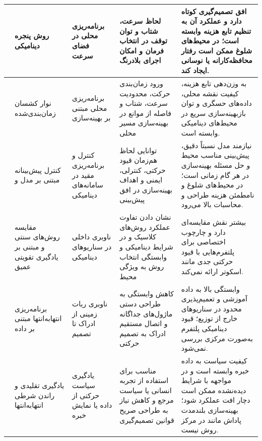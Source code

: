 \begin{longtable}{|C{2.35cm}|P{2.35cm}|P{2.65cm}|P{3.45cm}|P{3.95cm}|}
	\cite{fox1997dwa} &
	روش پنجره دینامیکی  &
	برنامه‌ریزی محلی در فضای سرعت &
	لحاظ سرعت، شتاب و توان توقف در انتخاب فرمان و امکان اجرای بلادرنگ &
	افق تصمیم‌گیری کوتاه دارد و عملکرد آن به تنظیم تابع هزینه وابسته است؛ در محیط‌های شلوغ ممکن است رفتار محافظه‌کارانه یا نوسانی ایجاد کند. \\
	\hline
	
	\cite{Quinlan1993ElasticBands,Rosmann2013TEB,Rosmann2015TEB} &
	نوار کشسان زمان‌بندی‌شده  &
	برنامه‌ریزی محلی مبتنی بر بهینه‌سازی &
	ورود زمان‌بندی حرکت، محدودیت سرعت، شتاب و فاصله از موانع در بهینه‌سازی مسیر محلی &
	به وزن‌دهی تابع هزینه، کیفیت نقشه محلی، داده‌های حسگری و توان بازبهینه‌سازی سریع در محیط‌های دینامیکی وابسته است. \\
	\hline
	
	\cite{rawlings2009mpc,Bemporad1999,Mayne2005TubeMPC} &
	کنترل پیش‌بینانه مبتنی بر مدل  و  &
	کنترل و برنامه‌ریزی مقید در سامانه‌های دینامیکی &
	توانایی لحاظ هم‌زمان قیود حرکتی، کنترلی، ایمنی و اهداف بهینه‌سازی در افق پیش‌بینی &
	نیازمند مدل نسبتاً دقیق، پیش‌بینی مناسب محیط و حل مسئله بهینه‌سازی در هر گام زمانی است؛ در محیط‌های شلوغ و نامطمئن هزینه طراحی و محاسبات بالا می‌رود. \\
	\hline
	
	\cite{s23249672} &
	مقایسه روش‌های سنتی و مبتنی بر یادگیری تقویتی عمیق &
	ناوبری داخلی در سناریوهای دینامیکی &
	نشان دادن تفاوت عملکرد روش‌های کلاسیک و  در شرایط دینامیکی و وابستگی انتخاب روش به ویژگی محیط &
	بیشتر نقش مقایسه‌ای دارد و چارچوب اختصاصی برای پلتفرم‌هایی با قیود حرکتی جدی مانند اسکوتر ارائه نمی‌کند. \\
	\hline
	
	\cite{pfeiffer2018nav} &
	برنامه‌ریزی انتهابه‌انتها مبتنی بر داده &
	ناوبری ربات زمینی از ادراک تا تصمیم &
	کاهش وابستگی به طراحی دستی ماژول‌های جداگانه و اتصال مستقیم ادراک به تصمیم حرکتی &
	وابستگی بالا به داده آموزشی و تعمیم‌پذیری محدود در سناریوهای خارج از توزیع؛ قیود دینامیکی پلتفرم به‌صورت مرکزی بررسی نمی‌شود. \\
	\hline
	
	\cite{argall2009survey,codevilla2018endtoend} &
	یادگیری تقلیدی و راندن شرطی انتهابه‌انتها &
	یادگیری سیاست حرکتی از داده یا نمایش خبره &
	مناسب برای استفاده از تجربه انسانی یا سیاست مرجع و کاهش نیاز به طراحی صریح قوانین تصمیم‌گیری &
	کیفیت سیاست به داده خبره وابسته است و در مواجهه با شرایط دیده‌نشده ممکن است دچار افت عملکرد شود؛ بهینه‌سازی بلندمدت پاداش مانند  در مرکز روش نیست. \\
	\hline
	

\end{longtable}

